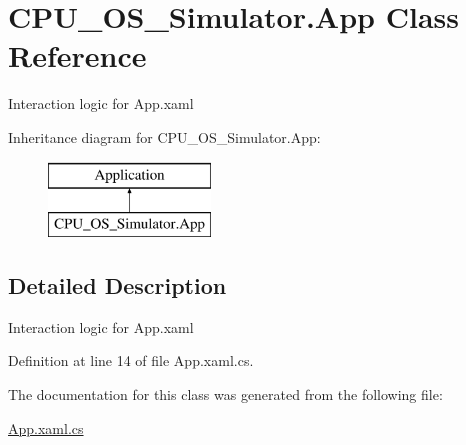 \hypertarget{class_c_p_u___o_s___simulator_1_1_app}{}\section{C\+P\+U\+\_\+\+O\+S\+\_\+\+Simulator.\+App Class Reference}
\label{class_c_p_u___o_s___simulator_1_1_app}


Interaction logic for App.\+xaml  


Inheritance diagram for C\+P\+U\+\_\+\+O\+S\+\_\+\+Simulator.\+App\+:\begin{figure}[H]
\begin{center}
\leavevmode
\includegraphics[height=2.000000cm]{class_c_p_u___o_s___simulator_1_1_app}
\end{center}
\end{figure}


\subsection{Detailed Description}
Interaction logic for App.\+xaml 



Definition at line 14 of file App.\+xaml.\+cs.



The documentation for this class was generated from the following file\+:\begin{DoxyCompactItemize}
\item 
\hyperlink{_app_8xaml_8cs}{App.\+xaml.\+cs}\end{DoxyCompactItemize}
